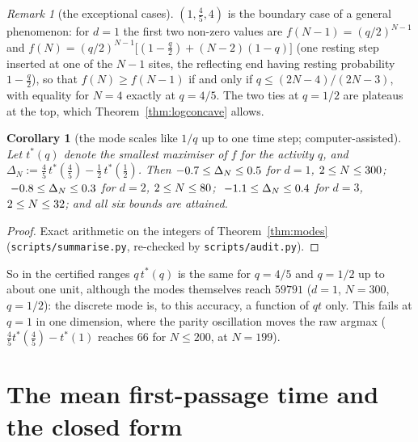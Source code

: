 \documentclass[11pt,a4paper]{article}
\newtheorem{corollary}[theorem]{Corollary}
\theoremstyle{definition}
\theoremstyle{remark}
\newtheorem{remark}[theorem]{Remark}
\begin{document}
\begin{remark}[the exceptional cases]\label{rem:exc}
$(1,\tfrac45,4)$ is the boundary case of a general phenomenon: for $d=1$ the first two non-zero values are $f(N-1)=(q/2)^{N-1}$ and $f(N)=(q/2)^{N-1}\bigl[(1-\tfrac q2)+(N-2)(1-q)\bigr]$ (one resting step inserted at one of the $N-1$ sites, the reflecting end having resting probability $1-\frac q2$), so that $f(N)\ge f(N-1)$ if and only if $q\le(2N-4)/(2N-3)$, with equality for $N=4$ exactly at $q=4/5$. The two ties at $q=1/2$ are plateaus at the top, which Theorem~\ref{thm:logconcave} allows.
\end{remark}

\begin{corollary}[the mode scales like $1/q$ up to one time step; computer-assisted]\label{cor:qscaling}
Let $t^*(q)$ denote the smallest maximiser of $f$ for the activity $q$, and $\Delta_N:=\tfrac45\,t^*(\tfrac45)-\tfrac12\,t^*(\tfrac12)$. Then
$-0.7\le\Delta_N\le0.5$ for $d=1$, $2\le N\le300$; $\ -0.8\le\Delta_N\le0.3$ for $d=2$, $2\le N\le80$; $\ -1.1\le\Delta_N\le0.4$ for $d=3$, $2\le N\le32$; and all six bounds are attained.
\end{corollary}
\begin{proof}
Exact arithmetic on the integers of Theorem~\ref{thm:modes} (\texttt{scripts/summarise.py}, re-checked by \texttt{scripts/audit.py}).
\end{proof}
So in the certified ranges $q\,t^*(q)$ is the same for $q=4/5$ and $q=1/2$ up to about one unit, although the modes themselves reach $59791$ ($d=1$, $N=300$, $q=1/2$): the discrete mode is, to this accuracy, a function of $qt$ only. This fails at $q=1$ in one dimension, where the parity oscillation moves the raw argmax ($\frac45t^*(\frac45)-t^*(1)$ reaches $66$ for $N\le200$, at $N=199$).

\section{The mean first-passage time and the closed form}\label{sec:cf}
\end{document}
